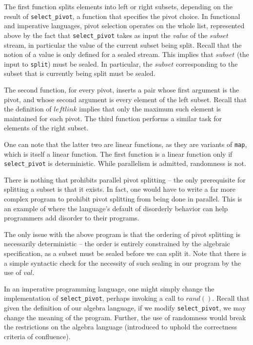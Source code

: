 The first function splits elements into left or right subsets, depending on the result of {\tt select\_pivot}, a function that specifies the pivot choice.  In functional and imperative languages, pivot selection operates on the whole list, represented above by the fact that {\tt select\_pivot} takes as input the {\em value} of the $subset$ stream, in particular the value of the current subset being split.  Recall that the notion of a value is only defined for a sealed stream.  This implies that $subset$ (the input to {\tt split}) must be sealed.  In particular, the $subset$ corresponding to the subset that is currently being split must be sealed.

The second function, for every pivot, inserts a pair whose first argument is the pivot, and whose second argument is every element of the left subset.  Recall that the definition of $leftlink$ implies that only the maximum such element is maintained for each pivot.  The third function performs a similar task for elements of the right subset.

One can note that the latter two are linear functions, as they are variants of {\tt map}, which is itself a linear function.  The first function is a linear function only if {\tt select\_pivot} is deterministic.  While parallelism is admitted, randomness is not.

There is nothing that prohibits parallel pivot splitting -- the only prerequisite for splitting a subset is that it exists.  In fact, one would have to write a far more complex program to prohibit pivot splitting from being done in parallel.  This is an example of where the language's default of disorderly behavior can help programmers add disorder to their programs.

The only issue with the above program is that the ordering of pivot splitting is necessarily deterministic -- the order is entirely constrained by the algebraic specification, as a subset must be sealed before we can split it.  Note that there is a simple syntactic check for the necessity of such sealing in our program by the use of $val$.

In an imperative programming language, one might simply change the implementation of {\tt select\_pivot}, perhaps invoking a call to $rand()$.  Recall that given the definition of our algebra language, if we modify {\tt select\_pivot}, we may change the meaning of the program.  Further, the use of randomness would break the restrictions on the algebra language (introduced to uphold the correctness criteria of confluence).

